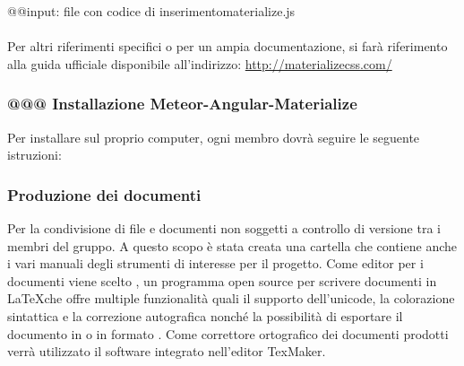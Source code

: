\documentclass[a4paper,11pt]{article}
\begin{document}
			 @@input: file con codice di inserimentomaterialize.js
			\\
			\\
			Per altri riferimenti specifici o per un ampia documentazione, si farà riferimento alla guida ufficiale disponibile all'indirizzo: \url{http://materializecss.com/}
			
			\subsubsection{@@@ Installazione Meteor-Angular-Materialize}
			Per installare  sul proprio computer, ogni membro dovrà seguire le seguente istruzioni:
			
			
			
			
			
	\subsubsection{Produzione dei documenti} \label{doc:prodoc}
	
	Per la condivisione di file e documenti non soggetti a controllo di versione tra i membri del gruppo. A questo scopo è stata creata una cartella che contiene anche i vari  manuali degli strumenti di interesse per il progetto.
	Come editor per i documenti viene scelto , un programma open source per scrivere documenti in \LaTeX   che offre multiple funzionalità quali il supporto dell'unicode, la colorazione sintattica e la correzione autografica nonché la possibilità di esportare il documento in  o in formato .
	Come correttore ortografico dei documenti prodotti verrà utilizzato il software \textbf{} integrato nell'editor TexMaker.
	\newpage
	
		
	
\end{document}
